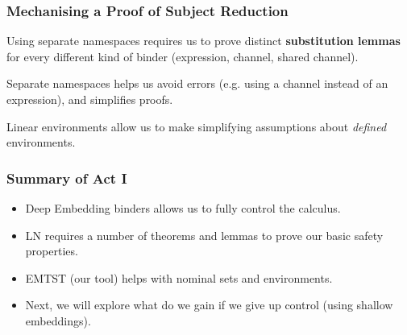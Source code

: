 \begin{frame}[fragile]
  \frametitle{Mechanising a Proof of Subject Reduction}

Using separate namespaces requires us to prove distinct \textbf{substitution lemmas} for every different kind of binder (expression, channel, shared channel).

\vspace{.3cm}

Separate namespaces helps us avoid errors (e.g. using a channel instead of an expression), and simplifies proofs.

\vspace{.3cm}

Linear environments allow us to make simplifying assumptions about \emph{defined} environments.

\end{frame}

\begin{frame}
  \frametitle{Summary of Act I}
\begin{itemize}
\item Deep Embedding binders allows us to fully control the calculus.
\item LN requires a number of theorems and lemmas to prove our basic safety properties.
\item EMTST (our tool) helps with nominal sets and environments.
\item Next, we will explore what do we gain if we give up control (using shallow embeddings).
\end{itemize}
\end{frame}
